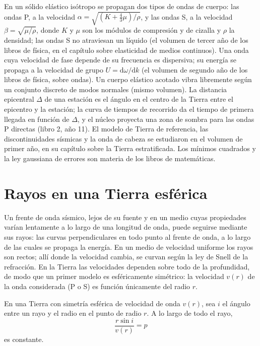 \begin{recall}
En un sólido elástico isótropo se propagan dos tipos de ondas de cuerpo: las ondas P, a la
velocidad $\alpha = \sqrt{(K + \tfrac43\mu)/\rho}$, y las ondas S, a
la velocidad $\beta = \sqrt{\mu/\rho}$, donde $K$ y $\mu$ son los módulos de compresión y de cizalla
y $\rho$ la densidad; las ondas S no atraviesan un líquido (el
volumen de tercer año de los libros de física, en el capítulo sobre elasticidad de medios continuos). Una onda cuya velocidad de fase
depende de su frecuencia es dispersiva; su energía se propaga a la
velocidad de grupo $U = \mathrm d\omega/\mathrm dk$ (el volumen de segundo año de los libros de física, sobre
ondas). Un cuerpo elástico acotado vibra libremente según un conjunto discreto de modos
normales (mismo volumen). La distancia epicentral $\Delta$ de una estación es el ángulo
en el centro de la Tierra entre el epicentro y la estación; la curva de tiempos de
recorrido da el tiempo de primera llegada en función de $\Delta$, y el núcleo proyecta una
zona de sombra para las ondas P directas (libro 2, año 11). El modelo de Tierra de referencia,
las discontinuidades sísmicas y la onda de cabeza se estudiaron en el volumen de primer año,
en su capítulo sobre la Tierra estratificada. Los mínimos cuadrados y la ley gaussiana de
errores son materia de los libros de matemáticas.
\end{recall}

\section{Rayos en una Tierra esférica}

Un frente de onda sísmico, lejos de su fuente y en un medio cuyas propiedades
varían lentamente a lo largo de una longitud de onda, puede seguirse mediante sus rayos: las curvas
perpendiculares en todo punto al frente de onda, a lo largo de las cuales se propaga la energía. En un
medio de velocidad uniforme los rayos son rectos; allí donde la velocidad cambia, se
curvan según la ley de Snell de la refracción. En la Tierra las velocidades dependen sobre todo de la
profundidad, de modo que un primer modelo es esféricamente simétrico: la velocidad $v(r)$ de la
onda considerada (P o S) es función únicamente del radio $r$.

\begin{theorem}\label{thm:b3:seismology-imaging:snell}
En una Tierra con simetría esférica de velocidad de onda $v(r)$, sea $i$ el ángulo
entre un rayo y el radio en el punto de radio $r$. A lo largo de todo el rayo,
\[
  \frac{r\sin i}{v(r)} = p
\]
es constante.
\end{theorem}

